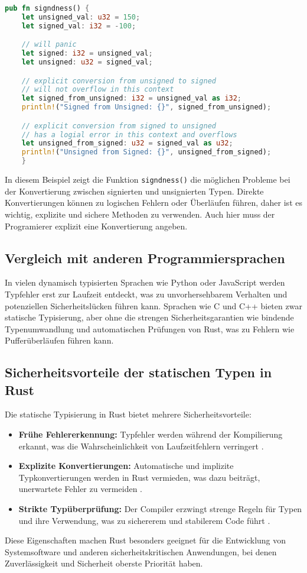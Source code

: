 \begin{lstlisting}[language=Rust, caption={Signiertheit}]
pub fn signdness() {
    let unsigned_val: u32 = 150;
    let signed_val: i32 = -100;

    // will panic 
    let signed: i32 = unsigned_val;
    let unsigned: u32 = signed_val;

    // explicit conversion from unsigned to signed
    // will not overflow in this context
    let signed_from_unsigned: i32 = unsigned_val as i32;
    println!("Signed from Unsigned: {}", signed_from_unsigned);

    // explicit conversion from signed to unsigned
    // has a logial error in this context and overflows
    let unsigned_from_signed: u32 = signed_val as u32;
    println!("Unsigned from Signed: {}", unsigned_from_signed); 
    }
\end{lstlisting}
\noindent
In diesem Beispiel zeigt die Funktion \texttt{signdness()} die möglichen Probleme bei der Konvertierung zwischen signierten und unsignierten Typen. 
Direkte Konvertierungen können zu logischen Fehlern oder Überläufen führen, daher ist es wichtig, explizite und sichere Methoden zu verwenden.
Auch hier muss der Programierer explizit eine Konvertierung angeben.

\subsection{Vergleich mit anderen Programmiersprachen}

In vielen dynamisch typisierten Sprachen wie Python oder JavaScript werden Typfehler erst zur Laufzeit entdeckt, was zu unvorhersehbarem Verhalten und potenziellen Sicherheitslücken führen kann. 
Sprachen wie C und C++ bieten zwar statische Typisierung, aber ohne die strengen Sicherheitsgarantien wie bindende Typenumwandlung und automatischen Prüfungen von Rust, was zu Fehlern wie Pufferüberläufen führen kann.

\subsection{Sicherheitsvorteile der statischen Typen in Rust}

Die statische Typisierung in Rust bietet mehrere Sicherheitsvorteile:
\begin{itemize}
    \item \textbf{Frühe Fehlererkennung:} Typfehler werden während der Kompilierung erkannt, was die Wahrscheinlichkeit von Laufzeitfehlern verringert \cite{shuklin2020}.
    \item \textbf{Explizite Konvertierungen:} Automatische und implizite Typkonvertierungen werden in Rust vermieden, was dazu beiträgt, unerwartete Fehler zu vermeiden \cite{drysdale2024} .
    \item \textbf{Strikte Typüberprüfung:} Der Compiler erzwingt strenge Regeln für Typen und ihre Verwendung, was zu sichererem und stabilerem Code führt \cite{shuklin2020}.
\end{itemize}
\noindent
Diese Eigenschaften machen Rust besonders geeignet für die Entwicklung von Systemsoftware und anderen sicherheitskritischen Anwendungen, bei denen Zuverlässigkeit und Sicherheit oberste Priorität haben.
